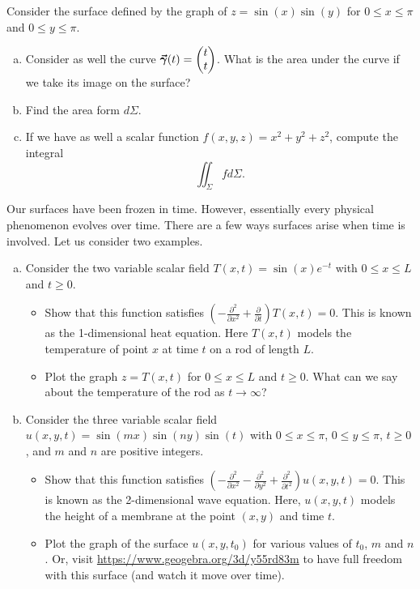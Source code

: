 \documentclass[12pt]{article} %
\begin{document}
\begin{problem}
    Consider the surface defined by the graph of $z=\sin(x)\sin(y)$ for $0\leq x \leq \pi$ and $0\leq y\leq \pi$. 
    \begin{enumerate}[(a)]
        \item Consider as well the curve $\boldsymbol{\vec{\gamma}}(t) = \begin{pmatrix} t \\ t \end{pmatrix}$.  What is the area under the curve if we take its image on the surface?
        \item Find the area form $d\Sigma$.
        \item If we have as well a scalar function $f(x,y,z)=x^2+y^2+z^2$, compute the integral
        \[
        \iint_\Sigma f d\Sigma.
        \]
    \end{enumerate}
\end{problem}

\begin{problem}
    Our surfaces have been frozen in time.  However, essentially every physical phenomenon evolves over time.  There are a few ways surfaces arise when time is involved.  Let us consider two examples.
    \begin{enumerate}[(a)]
        \item Consider the two variable scalar field $T(x,t) = \sin(x)e^{-t}$ with $0\leq x \leq L$ and $t\geq 0$. 
        \begin{itemize}
            \item Show that this function satisfies $\left(-\frac{\partial^2}{\partial x^2} + \frac{\partial}{\partial t}\right) T(x,t)=0$. This is known as the 1-dimensional heat equation. Here $T(x,t)$ models the temperature of point $x$ at time $t$ on a rod of length $L$.
            \item Plot the graph $z=T(x,t)$ for $0\leq x \leq L$ and $t\geq 0$.  What can we say about the temperature of the rod as $t\to \infty$?
        \end{itemize}
        \item Consider the three variable scalar field $u(x,y,t) = \sin(mx)\sin(ny)\sin(t)$ with $0\leq x \leq \pi$, $0\leq y \leq \pi$, $t\geq 0$, and $m$ and $n$ are positive integers.
        \begin{itemize}
            \item Show that this function satisfies $\left(-\frac{\partial^2}{\partial x^2}-\frac{\partial^2}{\partial y^2} + \frac{\partial^2}{\partial t^2}\right)u(x,y,t) = 0.$ This is known as the 2-dimensional wave equation. Here, $u(x,y,t)$ models the height of a membrane at the point $(x,y)$ and time $t$.
            \item Plot the graph of the surface $u(x,y,t_0)$ for various values of $t_0$, $m$ and $n$.  Or, visit \url{https://www.geogebra.org/3d/y55rd83m} to have full freedom with this surface (and watch it move over time).
        \end{itemize}
    \end{enumerate}
\end{problem}
\end{document}
